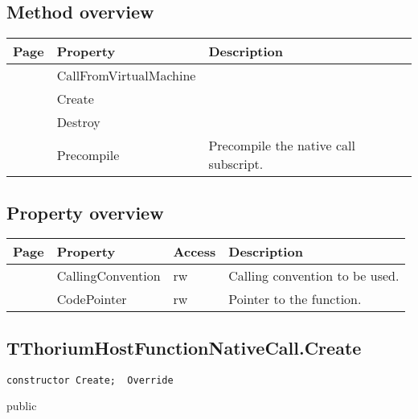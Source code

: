 \subsection{Method overview}
\label{thoriumcorepkg:thorium:tthoriumhostfunctionnativecall:methods}
\begin{tabularx}{\textwidth}{llX}
Page & Property & Description  \\ \hline
\pageref{thoriumcorepkg:thorium:tthoriumhostfunctionnativecall:callfromvirtualmachine} & CallFromVirtualMachine  &  \\
\pageref{thoriumcorepkg:thorium:tthoriumhostfunctionnativecall:create} & Create  &  \\
\pageref{thoriumcorepkg:thorium:tthoriumhostfunctionnativecall:destroy} & Destroy  &  \\
\pageref{thoriumcorepkg:thorium:tthoriumhostfunctionnativecall:precompile} & Precompile  & Precompile the native call subscript. \\
\hline
\end{tabularx}
\subsection{Property overview}
\label{thoriumcorepkg:thorium:tthoriumhostfunctionnativecall:properties}
\begin{tabularx}{\textwidth}{lllX}
Page & Property & Access & Description \\ \hline
\pageref{thoriumcorepkg:thorium:tthoriumhostfunctionnativecall:callingconvention} & CallingConvention & rw & Calling convention to be used. \\
\pageref{thoriumcorepkg:thorium:tthoriumhostfunctionnativecall:codepointer} & CodePointer & rw & Pointer to the function. \\
\hline
\end{tabularx}
\subsection{TThoriumHostFunctionNativeCall.Create}
\label{thoriumcorepkg:thorium:tthoriumhostfunctionnativecall:create}
\begin{FPCList}
\Declaration 

\begin{verbatim}
constructor Create;  Override
\end{verbatim}
\Visibility
public
\end{FPCList}
